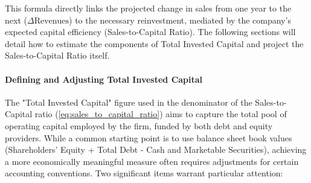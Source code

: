 This formula directly links the projected change in sales from one year to the next (\(\Delta \text{Revenues}\)) to the necessary reinvestment, mediated by the company's expected capital efficiency (Sales-to-Capital Ratio). The following sections will detail how to estimate the components of Total Invested Capital and project the Sales-to-Capital Ratio itself.

\paragraph{Defining and Adjusting Total Invested Capital} \label{par:defining_total_capital}
The "Total Invested Capital" figure used in the denominator of the Sales-to-Capital ratio (\ref{eq:sales_to_capital_ratio}) aims to capture the total pool of operating capital employed by the firm, funded by both debt and equity providers. While a common starting point is to use balance sheet book values (Shareholders' Equity + Total Debt - Cash and Marketable Securities), achieving a more economically meaningful measure often requires adjustments for certain accounting conventions. Two significant items warrant particular attention:

